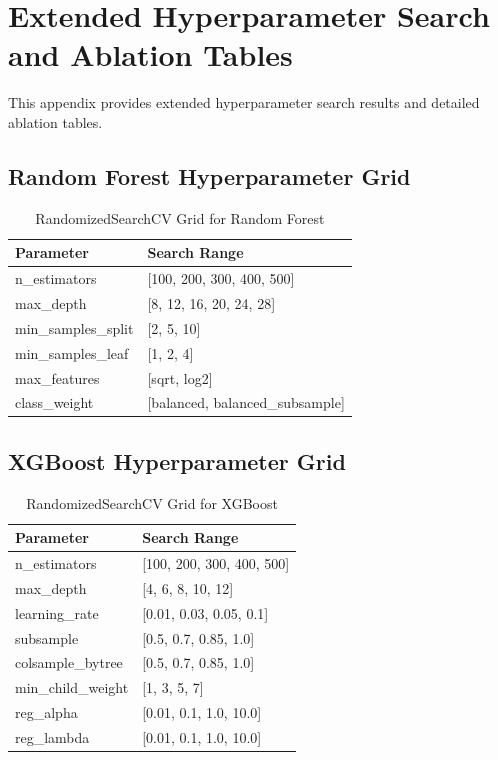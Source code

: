 \chapter{Extended Hyperparameter Search and Ablation Tables}
\label{app:extended_tables}

This appendix provides extended hyperparameter search results and detailed ablation tables.

\section{Random Forest Hyperparameter Grid}

\begin{table}[htbp]
\centering
\caption{RandomizedSearchCV Grid for Random Forest}
\begin{tabular}{ll}
\toprule
Parameter & Search Range \\
\midrule
n\_estimators & [100, 200, 300, 400, 500] \\
max\_depth & [8, 12, 16, 20, 24, 28] \\
min\_samples\_split & [2, 5, 10] \\
min\_samples\_leaf & [1, 2, 4] \\
max\_features & [sqrt, log2] \\
class\_weight & [balanced, balanced\_subsample] \\
\bottomrule
\end{tabular}
\label{tab:rf_grid}
\end{table}

\section{XGBoost Hyperparameter Grid}

\begin{table}[htbp]
\centering
\caption{RandomizedSearchCV Grid for XGBoost}
\begin{tabular}{ll}
\toprule
Parameter & Search Range \\
\midrule
n\_estimators & [100, 200, 300, 400, 500] \\
max\_depth & [4, 6, 8, 10, 12] \\
learning\_rate & [0.01, 0.03, 0.05, 0.1] \\
subsample & [0.5, 0.7, 0.85, 1.0] \\
colsample\_bytree & [0.5, 0.7, 0.85, 1.0] \\
min\_child\_weight & [1, 3, 5, 7] \\
reg\_alpha & [0.01, 0.1, 1.0, 10.0] \\
reg\_lambda & [0.01, 0.1, 1.0, 10.0] \\
\bottomrule
\end{tabular}
\label{tab:xgb_grid}
\end{table}

